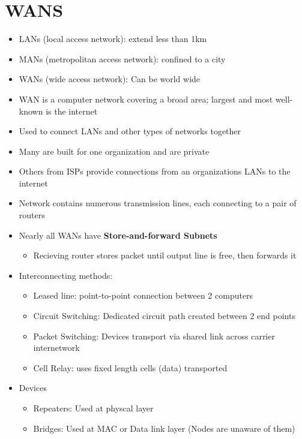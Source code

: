 \documentclass{article}
\begin{document}
    \section{WANS}
    \begin{itemize}
        \item LANs (local access network): extend less than 1km
        \item MANs (metropolitan access network): confined to a city
        \item WANs (wide access network): Can be world wide
        \item WAN is a computer network covering a broad area; largest and most well-known is the internet
        \item Used to connect LANs and other types of networks together
        \item Many are built for one organization and are private
        \item Others from ISPs provide connections from an organizations LANs to the internet
        \item Network contains numerous transmission lines, each connecting to a pair of routers
        \item Nearly all WANs have \textbf{Store-and-forward Subnets}
        \begin{itemize}
            \item Recieving router stores packet until output line is free, then forwards it
        \end{itemize}
        \item Interconnecting methods:
        \begin{itemize}
            \item Leased line: point-to-point connection between 2 computers
            \item Circuit Switching: Dedicated circuit path created between 2 end points
            \item Packet Switching: Devices transport via shared link across carrier internetwork
            \item Cell Relay: uses fixed length cells (data)  transported
        \end{itemize}
        \item Devices
        \begin{itemize}
            \item Repeaters: Used at physcal layer
            \item Bridges: Used at MAC or Data link layer (Nodes are unaware of them)

\end{itemize}
\end{itemize}
\end{document}
